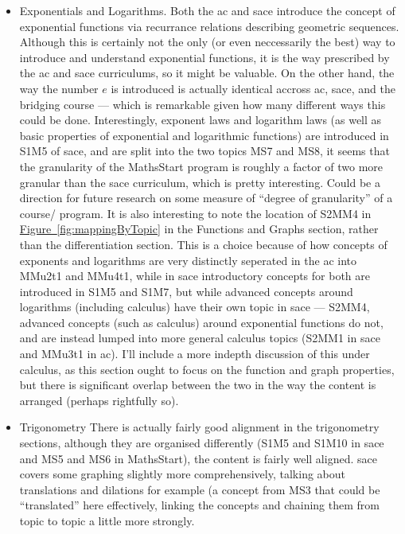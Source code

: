 \documentclass[twoside,12pt,a4paper]{report}
\newcommand{\reffig}[1]{\hyperref[fig:#1]{Figure~\ref{fig:#1}}}
\begin{document}
\begin{itemize}
\begin{itemize}
\begin{itemize}
				\end{itemize}
			\item Exponentials and Logarithms. Both the \gls{ac} and \gls{sace} introduce the concept of exponential functions via recurrance relations describing geometric sequences. Although this is certainly not the only (or even neccessarily the best) way to introduce and understand exponential functions, it is the way prescribed by the \gls{ac} and \gls{sace} curriculums, so it might be valuable.  On the other hand, the way the number $e$ is introduced is actually identical accross \gls{ac}, \gls{sace}, and the bridging course --- which is remarkable given how many different ways this could be done. Interestingly, exponent laws and logarithm laws (as well as basic properties of exponential and logarithmic functions) are introduced in S1M5 of \gls{sace}, and are split into the two topics MS7 and MS8, it seems that the granularity of the MathsStart program is roughly a factor of two more granular than the \gls{sace} curriculum, which is pretty interesting. Could be a direction for future research on some measure of ``degree of granularity'' of a course/ program. It is also interesting to note the location of S2MM4 in \reffig{mappingByTopic} in the Functions and Graphs section, rather than the differentiation section. This is a choice because of how concepts of exponents and logarithms are very distinctly seperated in the \gls{ac} into MMu2t1 and MMu4t1, while in \gls{sace} introductory concepts for both are introduced in S1M5 and S1M7, but while advanced concepts around logarithms (including calculus) have their own topic in \gls{sace} --- S2MM4, advanced concepts (such as calculus) around exponential functions do not, and are instead lumped into more general calculus topics (S2MM1 in \gls{sace} and MMu3t1 in \gls{ac}). I'll include a more indepth discussion of this under calculus, as this section ought to focus on the function and graph properties, but there is significant overlap between the two in the way the content is arranged (perhaps rightfully so).
			\item Trigonometry There is actually fairly good alignment in the trigonometry sections, although they are organised differently (S1M5 and S1M10 in \gls{sace} and MS5 and MS6 in MathsStart), the content is fairly well aligned. \gls{sace} covers some graphing slightly more comprehensively, talking about translations and dilations for example (a concept from MS3 that could be ``translated'' here effectively, linking the concepts and chaining them from topic to topic a little more strongly. 

\end{itemize}
\end{itemize}
\end{document}
